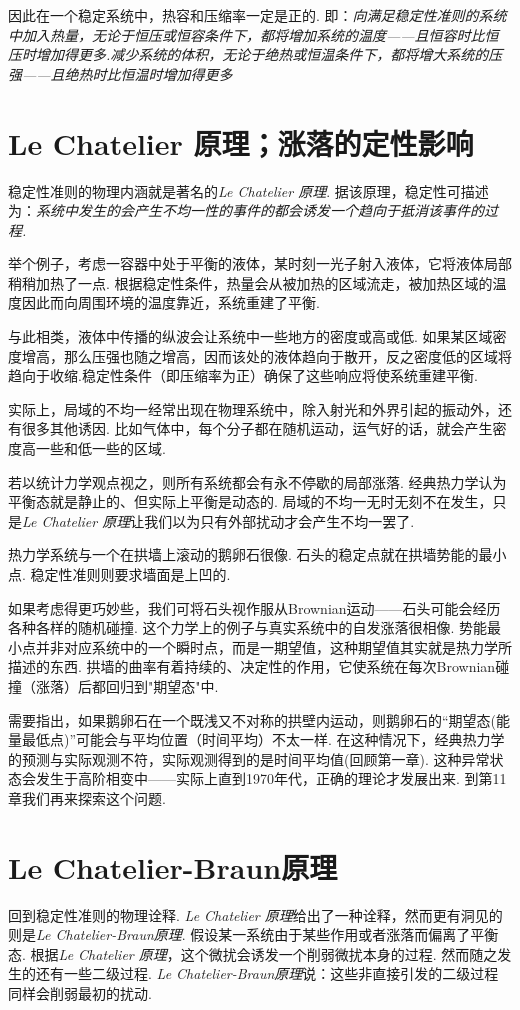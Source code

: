因此在一个稳定系统中，热容和压缩率一定是正的. 即：\textsl{向满足稳定性准则的系统中加入热量，无论于恒压或恒容条件下，都将增加系统的温度——且恒容时比恒压时增加得更多.减少系统的体积，无论于绝热或恒温条件下，都将增大系统的压强——且绝热时比恒温时增加得更多}

\section{Le Chatelier 原理；涨落的定性影响}
\label{sec8.4}
稳定性准则的物理内涵就是著名的\textsl{Le Chatelier 原理}. 据该原理，稳定性可描述为：\textsl{系统中发生的会产生不均一性的事件的都会诱发一个趋向于抵消该事件的过程.}

举个例子，考虑一容器中处于平衡的液体，某时刻一光子射入液体，它将液体局部稍稍加热了一点. 根据稳定性条件，热量会从被加热的区域流走，被加热区域的温度因此而向周围环境的温度靠近，系统重建了平衡.

与此相类，液体中传播的纵波会让系统中一些地方的密度或高或低. 如果某区域密度增高，那么压强也随之增高，因而该处的液体趋向于散开，反之密度低的区域将趋向于收缩.稳定性条件（即压缩率为正）确保了这些响应将使系统重建平衡.

实际上，局域的不均一经常出现在物理系统中，除入射光和外界引起的振动外，还有很多其他诱因. 比如气体中，每个分子都在随机运动，运气好的话，就会产生密度高一些和低一些的区域.

若以统计力学观点视之，则所有系统都会有永不停歇的局部涨落. 经典热力学认为平衡态就是静止的、但实际上平衡是动态的. 局域的不均一无时无刻不在发生，只是\textsl{Le Chatelier 原理}让我们以为只有外部扰动才会产生不均一罢了.

热力学系统与一个在拱墙上滚动的鹅卵石很像. 石头的稳定点就在拱墙势能的最小点. 稳定性准则则要求墙面是上凹的.

如果考虑得更巧妙些，我们可将石头视作服从Brownian运动——石头可能会经历各种各样的随机碰撞. 这个力学上的例子与真实系统中的自发涨落很相像. 势能最小点并非对应系统中的一个瞬时点，而是一期望值，这种期望值其实就是热力学所描述的东西. 拱墙的曲率有着持续的、决定性的作用，它使系统在每次Brownian碰撞（涨落）后都回归到"期望态"中.

需要指出，如果鹅卵石在一个既浅又不对称的拱壁内运动，则鹅卵石的“期望态(能量最低点)”可能会与平均位置（时间平均）不太一样. 在这种情况下，经典热力学的预测与实际观测不符，实际观测得到的是时间平均值(回顾第一章). 这种异常状态会发生于高阶相变中——实际上直到1970年代，正确的理论才发展出来. 到第11章我们再来探索这个问题.

\section{Le Chatelier-Braun原理}
\label{sec8.5}
回到稳定性准则的物理诠释. \textsl{Le Chatelier 原理}给出了一种诠释，然而更有洞见的则是\textsl{Le Chatelier-Braun原理}.
假设某一系统由于某些作用或者涨落而偏离了平衡态. 根据\textsl{Le Chatelier 原理}，这个微扰会诱发一个削弱微扰本身的过程. 然而随之发生的还有一些二级过程. \textsl{Le Chatelier-Braun原理}说：这些非直接引发的二级过程同样会削弱最初的扰动.

